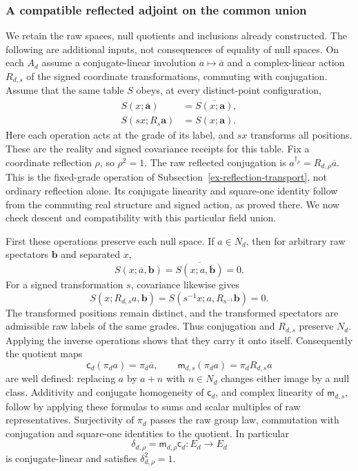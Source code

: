 \subsubsection{A compatible reflected adjoint on the common union}
\label{subsec:phase-union-adjoint}

We retain the raw spaces, null quotients and inclusions already constructed.
The following are additional inputs, not consequences of equality of null
spaces. On each $A_d$ assume a conjugate-linear involution
$a\mapsto\overline a$ and a complex-linear action $R_{d,s}$ of the
signed coordinate transformations, commuting with conjugation. Assume
that the same table $S$ obeys, at every distinct-point configuration,
\begin{equation}\label{eq:phase-raw-real-covariance}
 \begin{split}
 S(x;\overline{\boldsymbol a})
      &=\overline{S(x;\boldsymbol a)},\\
 S(sx;R_s\boldsymbol a)&=S(x;\boldsymbol a).
 \end{split}
\end{equation}
Here each operation acts at the grade of its label, and $sx$ transforms
all positions. These are the reality and signed covariance receipts for
this table. Fix a coordinate reflection $\rho$, so $\rho^2=1$.
The raw reflected conjugation is
$a^{\dagger_\rho}=R_{d,\rho}\overline a$. This is the fixed-grade
operation of Subsection~\ref{ex-reflection-transport}, not ordinary
reflection alone. Its conjugate linearity and square-one identity follow
from the commuting real structure and signed action, as proved there.
We now check descent and compatibility with this particular field union.

First these operations preserve each null space. If $a\in N_d$, then
for arbitrary raw spectators $\boldsymbol b$ and separated $x$,
\[
 S(x;\overline a,\boldsymbol b)
   =\overline{S(x;a,\overline{\boldsymbol b})}=0.
\]
For a signed transformation $s$, covariance likewise gives
\[
 S(x;R_{d,s}a,\boldsymbol b)
   =S(s^{-1}x;a,R_{s^{-1}}\boldsymbol b)=0.
\]
The transformed positions remain distinct, and the transformed spectators
are admissible raw labels of the same grades. Thus conjugation and $R_{d,s}$
preserve $N_d$. Applying the inverse operations shows that they carry it
onto itself. Consequently the quotient maps
\[
 \mathsf c_d(\pi_da)=\pi_d\overline a,\qquad
 \mathsf m_{d,s}(\pi_da)=\pi_dR_{d,s}a
\]
are well defined: replacing $a$ by $a+n$ with $n\in N_d$ changes either
image by a null class. Additivity and conjugate homogeneity of $\mathsf c_d$,
and complex linearity of $\mathsf m_{d,s}$, follow by applying these
formulas to sums and scalar multiples of raw representatives. Surjectivity
of $\pi_d$ passes the raw group law, commutation with conjugation and
square-one identities to the quotient. In particular
\[
 \delta_{d,\rho}=\mathsf m_{d,\rho}\mathsf c_d:E_d\longrightarrow E_d
\]
is conjugate-linear and satisfies $\delta_{d,\rho}^2=1$.


